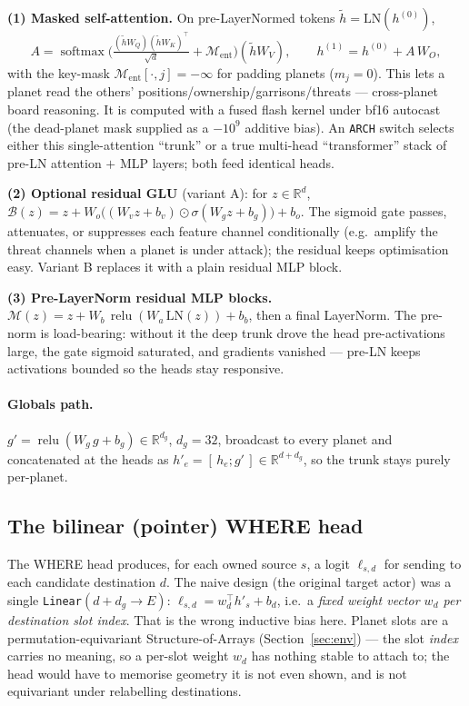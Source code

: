 \documentclass[11pt]{article}
\newcommand{\R}{\mathbb{R}}
\newcommand{\relu}{\operatorname{relu}}
\newcommand{\softmax}{\operatorname{softmax}}
\newcommand{\cd}[1]{\texttt{#1}}
\begin{document}
\smallskip\noindent\textbf{(1) Masked self-attention.} On pre-LayerNormed tokens
$\tilde h=\mathrm{LN}(h^{(0)})$,
\begin{equation}
A=\softmax\!\Big(\tfrac{(\tilde h W_Q)(\tilde h W_K)^{\!\top}}{\sqrt d}+\mathcal M_{\mathrm{ent}}\Big)
  (\tilde h W_V),\qquad h^{(1)}=h^{(0)}+A\,W_O,
\end{equation}
with the key-mask $\mathcal M_{\mathrm{ent}}[\cdot,j]=-\infty$ for padding planets ($m_j{=}0$). This lets
a planet read the others' positions/ownership/garrisons/threats --- cross-planet board reasoning. It is
computed with a fused flash kernel under bf16 autocast (the dead-planet mask supplied as a $-10^9$
additive bias). An \cd{ARCH} switch selects either this single-attention ``trunk'' or a true multi-head
``transformer'' stack of pre-LN attention $+$ MLP layers; both feed identical heads.

\smallskip\noindent\textbf{(2) Optional residual GLU} (variant A): for $z\in\R^d$,
$\mathcal B(z)=z+W_o\big((W_v z+b_v)\odot\sigma(W_g z+b_g)\big)+b_o$. The sigmoid gate passes,
attenuates, or suppresses each feature channel conditionally (e.g.\ amplify the threat channels when a
planet is under attack); the residual keeps optimisation easy. Variant B replaces it with a plain
residual MLP block.

\smallskip\noindent\textbf{(3) Pre-LayerNorm residual MLP blocks.}
$\mathcal M(z)=z+W_b\,\relu(W_a\,\mathrm{LN}(z))+b_b$, then a final LayerNorm. The pre-norm is
load-bearing: without it the deep trunk drove the head pre-activations large, the gate sigmoid saturated,
and gradients vanished --- pre-LN keeps activations bounded so the heads stay responsive.

\paragraph{Globals path.} $g'=\relu(W_g\,g+b_g)\in\R^{d_g}$, $d_g=32$, broadcast to every planet and
concatenated at the heads as $h'_e=[\,h_e;g'\,]\in\R^{d+d_g}$, so the trunk stays purely per-planet.

\subsection{The bilinear (pointer) WHERE head}\label{sec:bilinear}
The WHERE head produces, for each owned source $s$, a logit $\ell_{s,d}$ for sending to each candidate
destination $d$. The naive design (the original target actor) was a single \cd{Linear}$(d{+}d_g\to E)$:
$\ell_{s,d}=w_d^{\!\top}h'_s+b_d$, i.e.\ a \emph{fixed weight vector $w_d$ per destination slot index}.
That is the wrong inductive bias here. Planet slots are a permutation-equivariant Structure-of-Arrays
(Section~\ref{sec:env}) --- the slot \emph{index} carries no meaning, so a per-slot weight $w_d$ has
nothing stable to attach to; the head would have to memorise geometry it is not even shown, and is not
equivariant under relabelling destinations.
\end{document}
